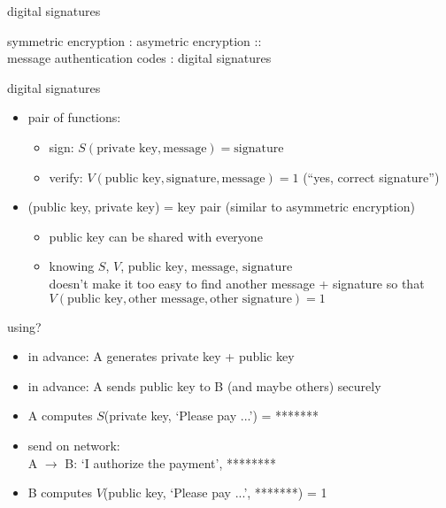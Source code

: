 \begin{frame}{digital signatures}

symmetric encryption : asymetric encryption :: \\
message authentication codes : digital signatures
\end{frame}

\begin{frame}{digital signatures}
    \begin{itemize}
    \item pair of functions:
        \begin{itemize}
        \item sign: $S(\text{private key}, \text{message}) = \text{signature}$
        \item verify: $V(\text{public key}, \text{signature}, \text{message}) = 1$ (``yes, correct signature'') 
        \end{itemize}
    \item (public key, private key) = key pair (similar to asymmetric encryption)
        \begin{itemize}
        \item public key can be shared with everyone
        \item knowing $S$, $V$, $\text{public key}$, $\text{message}$, $\text{signature}$ \\
            doesn't make it too easy to find another message + signature so that\\
            $V(\text{public key}, \text{other message}, \text{other signature}) = 1$
        \end{itemize}
    \end{itemize}
\end{frame}

\begin{frame}{using?}
    \begin{itemize}
    \item in advance: A generates private key + public key
    \item in advance: A sends public key to B (and maybe others) securely
    \vspace{.5cm}
    \item A computes $S$(private key, `Please pay ...') = *******
    \item send on network: \\
    A $\rightarrow$ B: `I authorize the payment', ********
    \item B computes $V$(public key, `Please pay ...', *******) = 1
    \end{itemize}
\end{frame}
